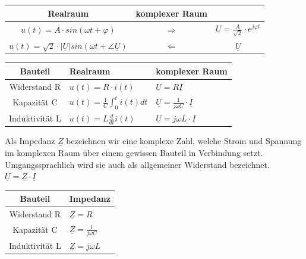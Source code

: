 \begin{center}
\begin{tabular}{ccc}
 Realraum & komplexer Raum \\
\hline
\hline
$ \displaystyle u(t) = A \cdot sin(\omega t + \varphi) $ & $  \Rightarrow $ & $\displaystyle \underline{U}  = \frac{A}{\sqrt{2}} \cdot e^{j\varphi t} $ \\
\hline
$ \displaystyle u(t) = \sqrt{2} \cdot |\underline{U}| sin(\omega t + \angle \underline{U}) $ & $\Leftarrow$ & $ \underline{U} $\\
\hline
\end{tabular}
\end{center}
\begin{center}

\begin{tabular}{c|ll}
 Bauteil & Realraum & komplexer Raum \\
\hline
\hline
Widerstand R & $u(t) = R \cdot i(t)$ & $\underline{U} = R \underline{I}$ \\
\hline
Kapazität C & $ u(t) = \frac{1}{C} \int_0^t i(t) dt $ & $\underline{U} = \frac{1}{j\omega C} \cdot \underline{I} $ \\
\hline

Induktivität L & $ u(t) = L \frac{d}{dt} i(t) $ & $\underline{U} = j\omega L \cdot \underline{I} $ \\
\hline
\end{tabular}

\end{center}




\iend




\beginip
Als Impedanz $\underline{Z}$ bezeichnen wir eine komplexe Zahl, welche Strom und Spannung im komplexen Raum über einem gewissen Bauteil in Verbindung setzt. \\
Umgangssprachlich wird sie auch als allgemeiner Widerstand bezeichnet. \\
\formulaBegin
$ \underline{U} = \underline{Z} \cdot \underline{I}$

\formulaEnd
\begin{center}

\begin{tabular}{c|l}


 Bauteil & Impedanz\\
\hline
\hline
Widerstand R & $\underline{Z} = R $\\
\hline
Kapazität C & $\underline{Z} = \frac{1}{j \omega C} $ \\
\hline

Induktivität L & $ \underline{Z} = j \omega L $ \\
\hline
\end{tabular}

\end{center}

